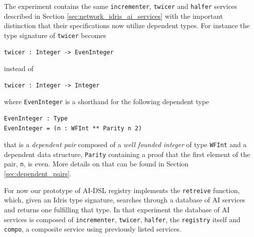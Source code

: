 \documentclass[]{report}
\begin{document}
The experiment contains the same \texttt{incrementer}, \texttt{twicer}
and \texttt{halfer} services described in Section
\ref{sec:network_idris_ai_services} with the important distinction that
their specifications now utilize dependent types.  For instance the
type signature of \texttt{twicer} becomes
\begin{verbatim}
twicer : Integer -> EvenInteger
\end{verbatim}
instead of
\begin{verbatim}
twicer : Integer -> Integer
\end{verbatim}
where \texttt{EvenInteger} is a shorthand for the following
dependent type
\begin{verbatim}
EvenInteger : Type
EvenInteger = (n : WFInt ** Parity n 2)
\end{verbatim}
that is a \emph{dependent pair} composed of a \emph{well founded
integer} of type \texttt{WFInt} and a dependent data structure,
\texttt{Parity} containing a proof that the first element of the pair,
\texttt{n}, is even.  More details on that can be found in
Section \ref{sec:dependent_pairs}.

For now our prototype of AI-DSL registry implements the
\texttt{retreive} function, which, given an Idris type signature,
searches through a database of AI services and returns one fulfilling
that type.  In that experiment the database of AI services is composed
of \texttt{incrementer}, \texttt{twicer}, \texttt{halfer}, the
\texttt{registry} itself and \texttt{compo}, a composite service using
previously listed services.
\end{document}
